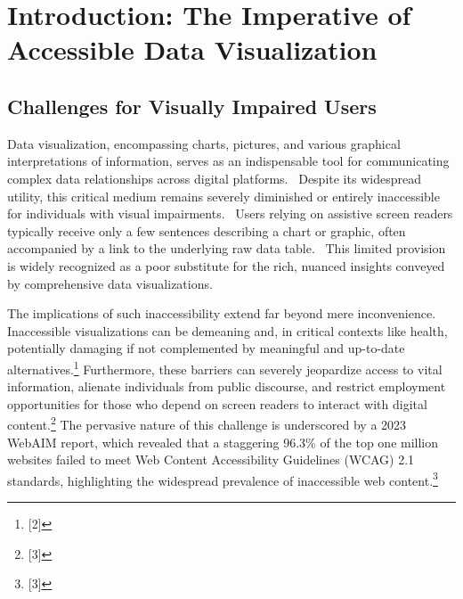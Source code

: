 \section{Introduction: The Imperative of Accessible Data Visualization}

\subsection{Challenges for Visually Impaired Users}
Data visualization, encompassing charts, pictures, and various graphical interpretations of information, serves as an indispensable tool for communicating complex data relationships across digital platforms.~\cite{ChallengesForVisuallyImpairedUsers} Despite its widespread utility, this critical medium remains severely diminished or entirely inaccessible for individuals with visual impairments.~\cite{ChallengesForVisuallyImpairedUsers} Users relying on assistive screen readers typically receive only a few sentences describing a chart or graphic, often accompanied by a link to the underlying raw data table.~\cite{ChallengesForVisuallyImpairedUsers} This limited provision is widely recognized as a poor substitute for the rich, nuanced insights conveyed by comprehensive data visualizations.~\cite{ChallengesForVisuallyImpairedUsers}

The implications of such inaccessibility extend far beyond mere inconvenience. Inaccessible visualizations can be demeaning and, in critical contexts like health, potentially damaging if not complemented by meaningful and up-to-date alternatives.\footnote{[2]} Furthermore, these barriers can severely jeopardize access to vital information, alienate individuals from public discourse, and restrict employment opportunities for those who depend on screen readers to interact with digital content.\footnote{[3]} The pervasive nature of this challenge is underscored by a 2023 WebAIM report, which revealed that a staggering 96.3\% of the top one million websites failed to meet Web Content Accessibility Guidelines (WCAG) 2.1 standards, highlighting the widespread prevalence of inaccessible web content.\footnote{[3]}

